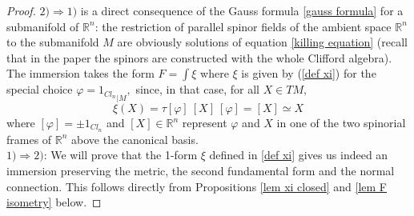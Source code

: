 \documentclass{amsart}
\begin{document}
\begin{proof} 
$2)\Rightarrow 1)$ is a direct consequence of the Gauss formula \eqref{gauss formula} for a submanifold of $\mathbb{R}^n$: 
the restriction of  parallel spinor fields of the ambient space $\mathbb{R}^n$ to the submanifold $M$ are obviously solutions of equation \eqref{killing equation} (recall that in the paper the spinors are constructed with the whole Clifford algebra). The immersion takes the form $F=\int\xi$ where $\xi$ is given by (\ref{def xi}) for the special choice $\varphi={1_{Cl_n}}_{|M},$ since, in that case, for all $X\in TM,$
$$\xi(X)=\tau[\varphi]\ [X]\ [\varphi]=[X]\simeq X$$
where $[\varphi]=\pm 1_{Cl_n}$ and $[X]\in{\mathbb{R}}^n$ represent $\varphi$ and $X$ in one of the two spinorial frames of ${\mathbb{R}}^n$ above the canonical basis.\\
$1)\Rightarrow 2)$: 
We will prove that the 1-form $\xi$ defined in \eqref{def xi} gives us indeed an immersion preserving the metric, the second fundamental form and the normal connection.  This follows directly from Propositions \ref{lem xi closed} and \ref{lem F isometry} below.
\end{proof}
\end{document}
